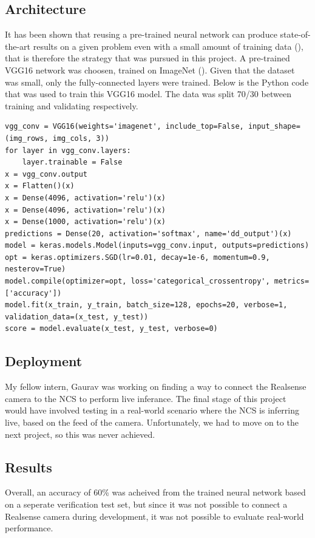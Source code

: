     \subsection{Architecture}
    It has been shown that reusing a pre-trained neural network can produce state-of-the-art results on a given problem even with a small amount of training data (\cite{Razavian_2014_CVPR_Workshops}), that is therefore the strategy that was pursued in this project. A pre-trained VGG16 network was choosen, trained on ImageNet (\cite{imagenet_cvpr09}). Given that the dataset was small, only the fully-connected layers were trained. Below is the Python code that was used to train this VGG16 model. The data was split 70/30 between training and validating respectively.
    \begin{lstlisting}[style=PythonStyle]
vgg_conv = VGG16(weights='imagenet', include_top=False, input_shape=(img_rows, img_cols, 3))
for layer in vgg_conv.layers:
    layer.trainable = False
x = vgg_conv.output
x = Flatten()(x)
x = Dense(4096, activation='relu')(x)
x = Dense(4096, activation='relu')(x)
x = Dense(1000, activation='relu')(x)
predictions = Dense(20, activation='softmax', name='dd_output')(x)
model = keras.models.Model(inputs=vgg_conv.input, outputs=predictions)
opt = keras.optimizers.SGD(lr=0.01, decay=1e-6, momentum=0.9, nesterov=True)
model.compile(optimizer=opt, loss='categorical_crossentropy', metrics=['accuracy'])
model.fit(x_train, y_train, batch_size=128, epochs=20, verbose=1, validation_data=(x_test, y_test))
score = model.evaluate(x_test, y_test, verbose=0)\end{lstlisting}

    \subsection{Deployment}
    My fellow intern, Gaurav was working on finding a way to connect the Realsense camera to the NCS to perform live inferance. The final stage of this project would have involved testing in a real-world scenario where the NCS is inferring live, based on the feed of the camera. Unfortunately, we had to move on to the next project, so this was never achieved.

    \subsection{Results}
    Overall, an accuracy of 60\% was acheived from the trained neural network based on a seperate verification test set, but since it was not possible to connect a Realsense camera during development, it was not possible to evaluate real-world performance.

